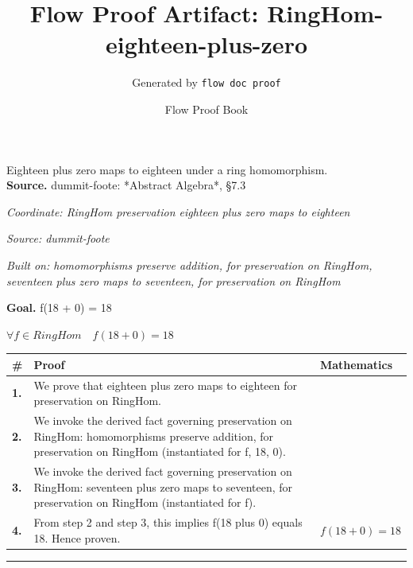\documentclass[11pt]{article}
\title{Flow Proof Artifact: RingHom-eighteen-plus-zero}
\author{Generated by \texttt{flow doc proof}}
\date{Flow Proof Book}
\theoremstyle{definition}
\begin{document}
\maketitle
Eighteen plus zero maps to eighteen under a ring homomorphism.\\[0.5em]
\textbf{Source.} dummit-foote: *Abstract Algebra*, §7.3\\[0.5em]
\bigskip
{}\par
\smallskip\noindent\textit{Coordinate: RingHom \cdot preservation \cdot eighteen plus zero maps to eighteen}\par
\smallskip\noindent\textit{Source: dummit-foote}\par
\smallskip\noindent\textit{Built on: homomorphisms preserve addition, for preservation on RingHom, seventeen plus zero maps to seventeen, for preservation on RingHom}\par
\medskip
\noindent\textbf{Goal.} f(18 + 0) = 18\par
\noindent$\displaystyle \forall f \in RingHom\quad f(18 + 0) = 18$\par
\medskip
\noindent
\begin{tabular}{@{} >{\raggedright\arraybackslash}p{} >{\raggedright\arraybackslash}p{} >{\raggedleft\arraybackslash}p{} @{}}
\textbf{\#} & \textbf{Proof} & \textbf{Mathematics} \\
\midrule
\textbf{1.} & We prove that eighteen plus zero maps to eighteen for preservation on RingHom. & \\[0.45em]
\textbf{2.} & We invoke the derived fact governing preservation on RingHom: homomorphisms preserve addition, for preservation on RingHom (instantiated for f, 18, 0). & \\[0.45em]
\textbf{3.} & We invoke the derived fact governing preservation on RingHom: seventeen plus zero maps to seventeen, for preservation on RingHom (instantiated for f). & \\[0.45em]
\textbf{4.} & From step 2 and step 3, this implies f(18 plus 0) equals 18. Hence proven. & $\displaystyle f(18 + 0) = 18$ \\[0.45em]
\bottomrule
\end{tabular}
\label{thm:RingHom-preservation-eighteen_plus_zero_maps_to_eighteen}
\par\medskip\hrule
\end{document}
